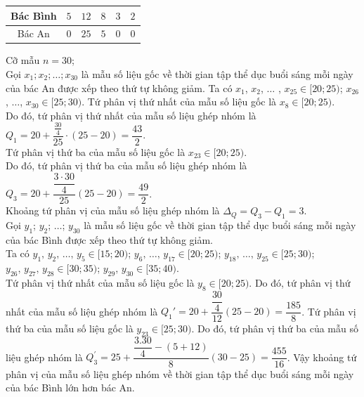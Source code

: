 \begin{ex}
{\begin{itemchoice}
\begin{center}
\begin{tabular}{|c|c|c|c|c|c|}
				\hline Bác  Bình & $5$ & $12$ & $8$ & $3$ & $2$ \\
				\hline Bác An & $0$ & $25$ & $5$ & $0$ &$  0$ \\
				 \hline
			\end{tabular}
		\end{center}
		 \itemch Cỡ mẫu $n=30$;\\
		Gọi $x_{1}; x_{2}; \ldots; x_{30}$ là mẫu số liệu gốc về thời gian tập thể dục buổi sáng mỗi ngày  của bác An được xếp theo thứ tự không giảm.
		 Ta có $x_{1} $, $x_{2} $, $\ldots$ , $x_{25} \in[20; 25) $; $x_{26} $, $\ldots $, $x_{30} \in[25; 30)$.
		Tứ phân vị thứ nhất của mẫu số liệu gốc là $x_{8}  \in[20; 25)$. \\
		 Do đó, tứ phân vị thứ nhất của mẫu số liệu ghép nhóm là $Q_{1}=20+\dfrac{\tfrac{30}{4}}{25}\cdot(25-20)=\dfrac{43}{2}$.\\
		Tứ phân vị thứ ba của mẫu số  liệu gốc là $x_{23} \in[20; 25)$. \\
		Do đó, tứ phân vị thứ ba của mẫu số liệu ghép nhóm là $Q_{3}=20+\dfrac{\dfrac{3\cdot  30}{4}}{25}(25-20)=\dfrac{49}{2}$.\\
		Khoảng  tứ phân vị của mẫu số liệu ghép nhóm là $\Delta_{Q}=Q_{3}-Q_{1}=3$.\\
		Gọi $y_{1} $; $y_{2} $; $\ldots $; $y_{30}$  là mẫu số liệu gốc về thời gian tập thể dục buổi sáng mỗi ngày của bác Bình được xếp theo thứ tự không giảm.\\
		Ta  có
		 $y_{1} ,\, y_{2} ,\, \ldots ,\, y_{5} \in[15; 20) $; $y_{6} ,\, \ldots ,\, y_{17} \in[20; 25) $; $y_{18} ,\, \ldots ,\, y_{25} \in[25; 30) $; \\
		$y_{26}  ,\, y_{27} ,\, y_{28} \in[30; 35)$; $y_{29} ,\, y_{30} \in[35; 40)$.\\
		Tứ phân vị thứ nhất của mẫu  số liệu gốc là $y_{8} \in[20; 25)$. Do đó, tứ phân vị thứ nhất của mẫu số liệu ghép nhóm là $Q_1'=20+\dfrac{\dfrac{30}{4}}{12}(25-20)=\dfrac{185}{8}$.
		\itemch Tứ phân vị thứ ba của mẫu số liệu gốc là $y_{23} \in[25; 30)$.  Do đó, tứ phân vị thứ ba của mẫu số liệu ghép nhóm là $Q_3^{\prime}=25+\dfrac{\dfrac{3.30}{4}-(5+12)}{8}(30-25)=\dfrac{455}{16}$.
		\itemch Vậy khoảng tứ phân vị của mẫu số liệu ghép nhóm về thời gian tập thể dục buổi sáng mỗi ngày của bác Bình lớn hơn bác An. 
	\end{itemchoice}
 }
\end{ex}


